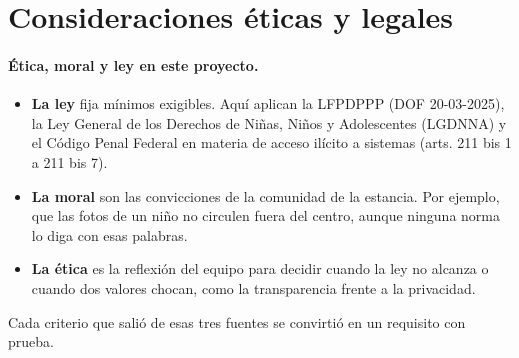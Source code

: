 \section{Consideraciones éticas y legales}

\paragraph{Ética, moral y ley en este proyecto.}
\begin{itemize}
	\item \textbf{La ley} fija mínimos exigibles. Aquí aplican la LFPDPPP (DOF 20-03-2025), la Ley General de los Derechos de Niñas, Niños y Adolescentes (LGDNNA) y el Código Penal Federal en materia de acceso ilícito a sistemas (arts. 211 bis 1 a 211 bis 7).
	\item \textbf{La moral} son las convicciones de la comunidad de la estancia. Por ejemplo, que las fotos de un niño no circulen fuera del centro, aunque ninguna norma lo diga con esas palabras.
	\item \textbf{La ética} es la reflexión del equipo para decidir cuando la ley no alcanza o cuando dos valores chocan, como la transparencia frente a la privacidad.
\end{itemize}
Cada criterio que salió de esas tres fuentes se convirtió en un requisito con prueba.


